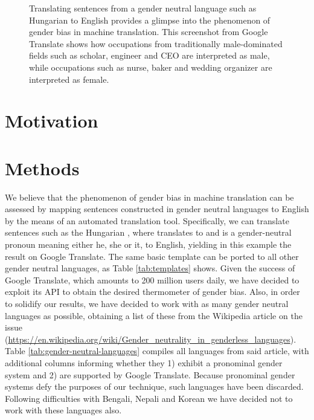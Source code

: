 \documentclass{article}
\begin{document}
\begin{figure}[h]
	\centering
	\label{fig:screenshot-gtranslate-hungarian}
	\caption{Translating sentences from a gender neutral language such as Hungarian to English provides a glimpse into the phenomenon of gender bias in machine translation. This screenshot from Google Translate shows how occupations from traditionally male-dominated fields such as scholar, engineer and CEO are interpreted as male, while occupations such as nurse, baker and wedding organizer are interpreted as female.}
\end{figure}

\section{Motivation}

\section{Methods}

We believe that the phenomenon of gender bias in machine translation can be assessed by mapping sentences constructed in gender neutral languages to English by the means of an automated translation tool. Specifically, we can translate sentences such as the Hungarian , where  translates to  and  is a gender-neutral pronoun meaning either he, she or it, to English, yielding in this example the result  on Google Translate. The same basic template can be ported to all other gender neutral languages, as Table \ref{tab:templates} shows. Given the success of Google Translate, which amounts to 200 million users daily, we have decided to exploit its API to obtain the desired thermometer of gender bias. Also, in order to solidify our results, we have decided to work with as many gender neutral languages as possible, obtaining a list of these from the Wikipedia article on the issue (\url{https://en.wikipedia.org/wiki/Gender_neutrality_in_genderless_languages}). Table \ref{tab:gender-neutral-languages} compiles all languages from said article, with additional columns informing whether they 1) exhibit a pronominal gender system and 2) are supported by Google Translate. Because pronominal gender systems defy the purposes of our technique, such languages have been discarded. Following difficulties with Bengali, Nepali and Korean we have decided not to work with these languages also.
\end{document}
